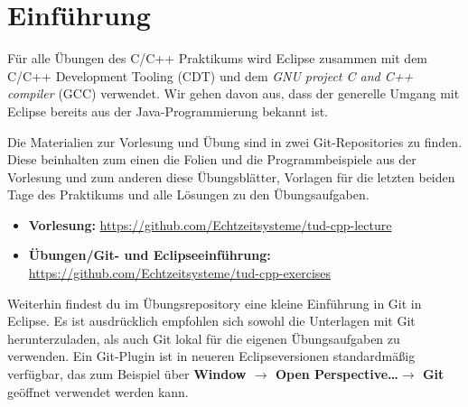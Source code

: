
\section*{Einführung}
Für alle Übungen des C/C++ Praktikums wird Eclipse zusammen mit dem C/C++ Development Tooling (CDT) und dem  \emph{GNU project C and C++ compiler} (GCC) verwendet.
Wir gehen davon aus, dass der generelle Umgang mit Eclipse bereits aus der Java-Programmierung bekannt ist.

Die Materialien zur Vorlesung und Übung sind in zwei Git-Repositories zu finden.
Diese beinhalten zum einen die Folien und die Programmbeispiele aus der Vorlesung und zum anderen diese Übungsblätter, Vorlagen für die letzten beiden Tage des Praktikums und alle Lösungen zu den Übungsaufgaben.

\begin{itemize}
	\item \textbf{Vorlesung:} \url{https://github.com/Echtzeitsysteme/tud-cpp-lecture}
	\item \textbf{Übungen/Git- und Eclipseeinführung:} \url{https://github.com/Echtzeitsysteme/tud-cpp-exercises}
\end{itemize}

Weiterhin findest du im Übungsrepository eine kleine Einführung in Git in Eclipse.
Es ist ausdrücklich empfohlen sich sowohl die Unterlagen mit Git herunterzuladen, als auch Git lokal für die eigenen Übungsaufgaben zu verwenden.
Ein Git-Plugin ist in neueren Eclipseversionen standardmäßig verfügbar, das zum Beispiel über \textbf{Window $\rightarrow$ Open Perspective\dots $\rightarrow$ Git}  geöffnet verwendet werden kann.


